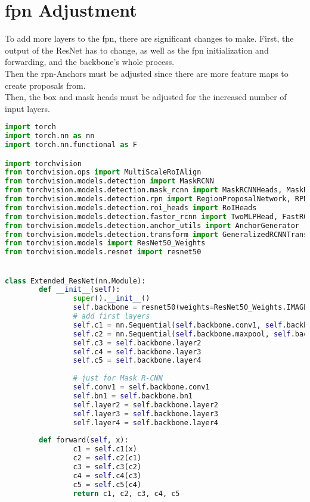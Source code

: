 	
	
	\section{\ac{fpn} Adjustment}
		To add more layers to the \acl{fpn}, there are significant changes to make. First, the output of the ResNet has to change, as well as the \ac{fpn} initialization and forwarding, and the backbone's whole process.\\
		Then the \ac{rpn}-Anchors must be adjusted since there are more feature maps to create proposals from.\\
		Then, the box and mask heads must be adjusted for the increased number of input layers.
	
	\begin{lstlisting}[language=Python,caption=Random Augmentation of the Background using cv2 in Python, label=lst:bg-augmentation]
import torch
import torch.nn as nn
import torch.nn.functional as F

import torchvision
from torchvision.ops import MultiScaleRoIAlign
from torchvision.models.detection import MaskRCNN
from torchvision.models.detection.mask_rcnn import MaskRCNNHeads, MaskRCNNPredictor
from torchvision.models.detection.rpn import RegionProposalNetwork, RPNHead
from torchvision.models.detection.roi_heads import RoIHeads
from torchvision.models.detection.faster_rcnn import TwoMLPHead, FastRCNNPredictor
from torchvision.models.detection.anchor_utils import AnchorGenerator
from torchvision.models.detection.transform import GeneralizedRCNNTransform
from torchvision.models import ResNet50_Weights
from torchvision.models.resnet import resnet50


class Extended_ResNet(nn.Module):
		def __init__(self):
				super().__init__()
				self.backbone = resnet50(weights=ResNet50_Weights.IMAGENET1K_V2)
				# add first layers
				self.c1 = nn.Sequential(self.backbone.conv1, self.backbone.bn1, self.backbone.relu) 
				self.c2 = nn.Sequential(self.backbone.maxpool, self.backbone.layer1) 
				self.c3 = self.backbone.layer2  
				self.c4 = self.backbone.layer3  
				self.c5 = self.backbone.layer4  
				
				# just for Mask R-CNN
				self.conv1 = self.backbone.conv1
				self.bn1 = self.backbone.bn1
				self.layer2 = self.backbone.layer2
				self.layer3 = self.backbone.layer3
				self.layer4 = self.backbone.layer4
		
		def forward(self, x):
				c1 = self.c1(x)
				c2 = self.c2(c1)
				c3 = self.c3(c2)
				c4 = self.c4(c3)
				c5 = self.c5(c4)
				return c1, c2, c3, c4, c5
		

\end{lstlisting}
